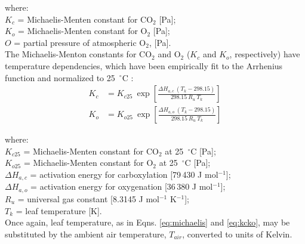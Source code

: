 \noindent where:\\
\indent $K_c$ = Michaelis-Menten constant for CO$_2$ [Pa];\\
\indent $K_o$ = Michaelis-Menten constant for O$_2$ [Pa];\\
\indent $O$ = partial pressure of atmospheric O$_2$, [Pa].\\

\noindent The Michaelis-Menton constants for CO$_2$ and O$_2$ ($K_c$ and $K_o$, respectively) have temperature dependencies, which have been empirically fit to the Arrhenius function and normalized to 25~$^\circ$C \parencite{farquhar80}:
%
%
\begin{subequations}
\label{eq:kcko}
\begin{align}
	K_c&=K_{c25}\: \exp \left[ 
    	\frac{\Delta H_{a,c}\: \left(T_k-298.15\right)}{298.15\: R_{u}\: T_k}
    \right] \label{eq:kc} \\
    K_o&=K_{o25}\: \exp \left[ 
    	\frac{\Delta H_{a,o}\: \left(T_k-298.15\right)}{298.15\: R_{u}\: T_k}
    \right] \label{eq:ko}
\end{align}
\end{subequations}

\noindent where:\\
\indent $K_{c25}$ = Michaelis-Menten constant for CO$_2$ at 25~$^{\circ}$C [Pa];\\
\indent $K_{o25}$ = Michaelis-Menten constant for O$_2$ at 25~$^{\circ}$C [Pa];\\
\indent $\Delta H_{a,c}$ = activation energy for carboxylation [79$\,$430 J mol$^{-1}$];\\
\indent $\Delta H_{a,o}$ = activation energy for oxygenation [36$\,$380 J mol$^{-1}$];\\
\indent $R_{u}$ = universal gas constant [8.3145 J mol$^{-1}$ K$^{-1}$];\\
\indent $T_k$ = leaf temperature [K].\\

\noindent Once again, leaf temperature, as in Eqns. \ref{eq:michaelis} and \ref{eq:kcko}, may be substituted by the ambient air temperature, $T_{air}$, converted to units of Kelvin. 

